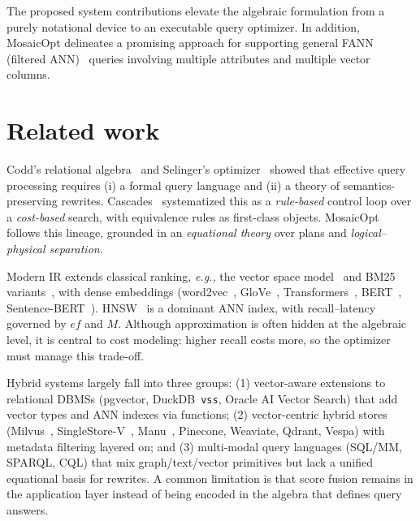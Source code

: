 \documentclass[sigconf]{acmart}
\theoremstyle{plain}
\theoremstyle{definition}
\newcommand{\eg}{\emph{e.g.,}\xspace}
\theoremstyle{remark}
\begin{document}
The proposed system contributions elevate the algebraic formulation from a purely notational device to an executable query optimizer. In addition, MosaicOpt delineates a promising approach for supporting general FANN (filtered ANN)~\cite{sehgal2025navix} queries involving multiple attributes and multiple vector columns.

\section{Related work}\label{sec:background}

Codd's relational algebra~\cite{codd1970} and Selinger's optimizer~\cite{selinger1979} showed that effective query processing requires (i) a formal query language and (ii) a theory of semantics-preserving rewrites. Cascades~\cite{graefe1994,graefe1995} systematized this as a \emph{rule-based} control loop over a \emph{cost-based} search, with equivalence rules as first-class objects. MosaicOpt follows this lineage, grounded in an \emph{equational theory} over plans and \emph{logical--physical separation}.

Modern IR extends classical ranking, \eg the vector space model~\cite{salton1975} and BM25 variants~\cite{bm25,bm25f}, with dense embeddings (word2vec~\cite{mikolov2013}, GloVe~\cite{pennington2014glove}, Transformers~\cite{vaswani2017attention}, BERT~\cite{devlin2019bert}, Sentence-BERT~\cite{reimers2019}). HNSW~\cite{hnsw} is a dominant ANN index, with recall--latency governed by $ef$ and $M$. Although approximation is often hidden at the algebraic level, it is central to cost modeling: higher recall costs more, so the optimizer must manage this trade-off.

Hybrid systems largely fall into three groups: (1) vector-aware extensions to relational DBMSs (pgvector, DuckDB~\texttt{vss}, Oracle AI Vector Search) that add vector types and ANN indexes via functions; (2) vector-centric hybrid stores (Milvus~\cite{wang2021milvus}, SingleStore-V~\cite{wei2024singlestore}, Manu~\cite{jiang2024manu}, Pinecone, Weaviate, Qdrant, Vespa) with metadata filtering layered on; and (3) multi-modal query languages (SQL/MM, SPARQL, CQL) that mix graph/text/vector primitives but lack a unified equational basis for rewrites. A common limitation is that score fusion remains in the application layer instead of being encoded in the algebra that defines query answers.
\end{document}

